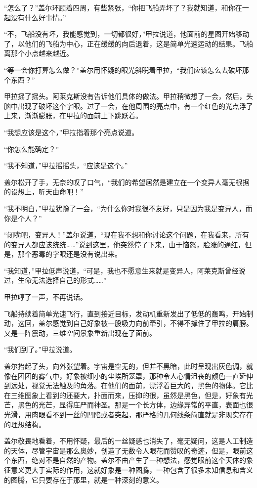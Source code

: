 “怎么了？”盖尔环顾着四周，有些紧张，“你把飞船弄坏了？我就知道，和你在一起没有什么好事情。” 

“不，飞船没有坏，我能感觉到，一切都很好，”甲拉说道，他面前的星图开始移动了，以他们的飞船为中心，正在缓缓的向后退着，这是简单光速运动的结果。飞船离那个小点越来越近。 

“等一会你打算怎么做？”盖尔用怀疑的眼光斜睨着甲拉，“我们应该怎么去破坏那个东西？” 

甲拉摇了摇头。阿莱克斯没有告诉他们具体的做法。甲拉稍微想了一会，然后，头脑中出现了破坏这个字眼。过了一会，在他周围的亮点中，有一个红色的光点浮了上来，渐渐膨胀，在甲拉的面前上下跳跃着。 

“我想应该是这个，”甲拉指着那个亮点说道。 

“你怎么能确定？” 

“我不知道，”甲拉摇摇头，“应该是这个。” 

盖尔松开了手，无奈的叹了口气，“我们的希望居然是建立在一个变异人毫无根据的设想上，听天由命吧！” 

“我不明白，”甲拉犹豫了一会，“为什么你对我很不友好，只是因为我是变异人，而你是个人？” 

“闭嘴吧，变异人！”盖尔说道，“现在我不想和你讨论这个问题，在我看来，所有的变异人都应该统统……”说到这里，他突然停了下来，由于恼怒，脸涨的通红，但是，那个恶毒的字眼还是没有说出来。 

“我知道，”甲拉低声说道，“可是，我也不愿意生来就是变异人，阿莱克斯曾经说过，生命无法选择自己的形式……” 

甲拉哼了一声，不再说话。 

飞船持续着简单光速飞行，直到接近目标，发动机重新发出了低低的轰鸣，开始制动，这回，盖尔感觉到自己好象被一股吸力向前牵引，不得不撑住了甲拉的肩膀。又是一阵震动，三维空间景象重新出现在了面前。 

“我们到了。”甲拉说道。 

盖尔抬起了头，向外张望着。宇宙是空无的，但并不黑暗，此时呈现出灰色调，就像在团团的雾气中，好象被细小的尘埃所笼罩，那种令人心情沮丧的颜色一直延伸到远处，视觉无法触及的角落。在他们的面前，漂浮着巨大的，黑色的物体。它比在三维图象上看到的还要大，扑面而来，压抑的很，虽然是黑色，但是，好象有光芒，黑色的光芒，显得庄严而神圣。那是一个长方体，边缘异常的平直，表面也很光滑，用肉眼看不到一丝的凹陷或者突起，那严格的几何线条简直就是非现实存在的理想结构。 

盖尔敬畏地看着，不用怀疑，最后的一丝疑惑也消失了，毫无疑问，这是人工制造的天体，尽管宇宙是那么奥妙，创造了无数令人眼花而赞叹的奇迹，但是，眼前这个东西，绝对不是自然的产物。盖尔不由产生了一种想法，感觉眼前这个天体的象征意义更大于实际的作用，这就好象是一种图腾，一种包含了很多未知信息和含义的图腾，它只要存在于那里，就是一种深刻的意义。 

